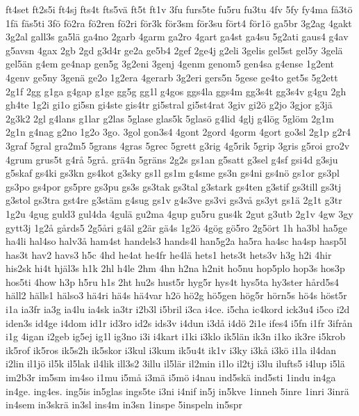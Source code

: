 {ft4set
ft2s5i
ft4sj
fts4t
fts5v^^e4
ft5t
ft1v
3fu
furs5te
fu5ru
fu3tu
4fv
5fy
fy4ma
f^^e53t^^f6
1f^^e4
f^^e4s5ti
3f^^f6
f^^f62ra
f^^f62ren
f^^f62ri
f^^f6r3k
f^^f6r3sm
f^^f6r3su
f^^f6rt4
f^^f6r1^^f6
ga5br
3g2ag
4gakt
3g2al
gall3s
ga5l^^e4
ga4no
2garb
4garm
ga2ro
4gart
ga4st
ga4su
5g2ati
gaus4
g4av
g5avsn
4gax
2gb
2gd
g3d4r
ge2a
ge5b4
2gef
2ge4j
g2eli
3gelis
gel5st
gel5y
3gel^^e4
gel5^^e4n
g4em
ge4nap
gen5g
3g2eni
3genj
4genm
genom5
gen4sa
g4ense
1g2ent
4genv
ge5ny
3gen^^e4
ge2o
1g2era
4gerarb
3g2eri
gers5n
5gese
ge4to
get5s
5g2ett
2g1f
2gg
g1ga
g4gap
g1ge
gg5g
gg1l
g4gos
ggs4la
ggs4m
gg3s4t
gg3s4v
g4gu
2gh
gh4te
1g2i
gi1o
gi5sn
gi4ste
gis4tr
gi5stral
gi5st4rat
3giv
gi2^^f6
g2jo
3gjor
g3j^^e4
2g3k2
2gl
g4lans
g1lar
g2las
5glase
glas5k
5glas^^f6
g4lid
4glj
g4l^^f6g
5gl^^f6m
2g1m
2g1n
g4nag
g2no
1g2o
3go.
3gol
gon3s4
4gont
2gord
4gorm
4gort
go3sl
2g1p
g2r4
3graf
5gral
gra2m5
5grans
4gras
5grec
5grett
g3rig
4g5rik
5grip
3gris
g5roi
gro2v
4grum
grus5t
g4r^^e5
5gr^^e5.
gr^^e44n
5gr^^e4ns
2g2s
gs1an
g5satt
g3sel
g4sf
gsi4d
g3sju
g5skaf
gs4ki
gs3kn
gs4kot
g3sky
gs1l
gs1m
g4sme
gs3n
gs4ni
gs4n^^f6
gs1or
gs3pl
gs3po
gs4por
gs5pre
gs3pu
gs3s
gs3tak
gs3tal
g3stark
gs4ten
g3stif
gs3till
gs3tj
g3stol
gs3tra
gst4re
g3st^^e4m
g4sug
gs1v
g4s3ve
gs3vi
gs3v^^e5
gs3yt
gs1^^e4
2g1t
g3tr
1g2u
4gug
guld3
gul4da
4gul^^e4
gu2ma
4gup
gu5ru
gus4k
2gut
g3utb
2g1v
4gw
3gy
gytt3j
1g2^^e5
g^^e5rds5
2g5^^e5ri
g4^^e4l
g2^^e4r
g^^e44s
1g2^^f6
4g^^f6g
g^^f65ro
2g5^^f6rt
1h
ha3bl
ha5ge
ha4li
hal4so
halv3^^e5
ham4st
handels3
hands4l
han5g2a
ha5ra
ha4sc
ha4sp
hasp5l
has3t
hav2
havs3
h5c
4hd
he4at
he4fr
he4l^^e4
hets1
hets3t
hets3v
h3g
h2i
4hir
his2sk
hi4t
hj^^e4l3s
h1k
2hl
h4le
2hm
4hn
h2na
h2nit
ho5nu
hop5plo
hop3s
hos3p
hos5ti
4how
h3p
h5ru
h1s
2ht
hu2s
hust5r
hyg5r
hys4t
hys5ta
hy3ster
h^^e5rd5s4
h^^e4ll2
h^^e4lls1
h^^e4lso3
h^^e44ri
h^^e44s
h^^e44var
h2^^f6
h^^f62g
h^^f65gen
h^^f6g5r
h^^f6rn5s
h^^f64s
h^^f6st5r
i1a
ia3fr
ia3g
ia4lu
ia4sk
ia3tr
i2b3l
i5bril
i3ca
i4ce.
i5cha
ic4kord
ick3u4
i5co
i2d
iden3s
id4ge
i4dom
id1r
id3ro
id2s
ids3v
i4dun
i3d^^e5
i4d^^f6
2i1e
ifes4
i5fn
i1fr
3ifr^^e5n
i1g
4igan
i2geb
ig5ej
ig1l
ig3no
i3i
i4kart
i1ki
i3klo
ik5l^^e4n
ik3n
i1ko
ik3re
i5krob
ik5rof
ik5ros
ik5s2h
ik5skor
i3kul
i3kum
ik5u4t
ik1v
i3ky
i3k^^e5
i3k^^f6
i1la
il4dan
i2lin
il1j^^f6
il5k
il5lak
il4lik
ill3s2
3illu
il5l^^e4r
il2min
i1lo
il2tj
i3lu
ilufts5
i4lup
i5l^^e4
im2b3r
im5sm
im4so
i1mu
i5m^^e5
i3m^^e4
i5m^^f6
i4nau
ind5sk^^e4
ind5sti
1indu
in4ga
in4ge.
ing4es.
ing5is
in5glas
ings5te
i3ni
i4nif
in5j
in5kve
1inneh
5inre
1inri
3inr^^e4
in4sem
in3skr^^e4
in3sl
ins4m
in3sn
1inspe
5inspeln
in5spr
}
